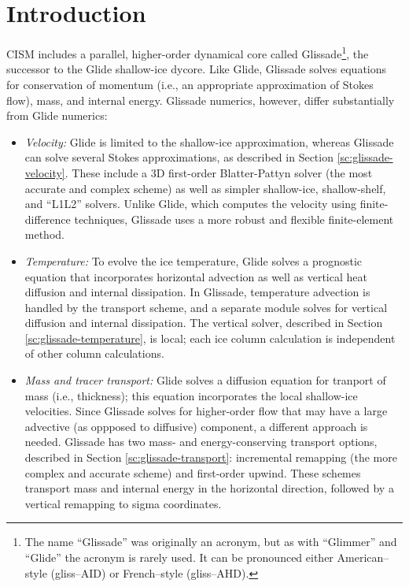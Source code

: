 

\section{Introduction}
\label{sc:glissade-intro}

CISM includes a parallel, higher-order dynamical core called Glissade\footnote
{The name ``Glissade'' was originally an acronym, but as with ``Glimmer'' and ``Glide'' the acronym is rarely used.
It can be pronounced either American--style (gliss--AID) or French--style (gliss--AHD).},
the successor to the Glide shallow-ice dycore.
Like Glide, Glissade solves equations for conservation of momentum
(i.e., an appropriate approximation of Stokes flow), mass, and internal energy. 
Glissade numerics, however, differ substantially from Glide numerics:

\begin{itemize}

\item \textit{Velocity:}
Glide is limited to the shallow-ice approximation, whereas Glissade can solve several Stokes
approximations, as described in Section \ref{sc:glissade-velocity}.
These include a 3D first-order Blatter-Pattyn solver (the most accurate and complex scheme)
as well as simpler shallow-ice, shallow-shelf, and ``L1L2'' solvers.
Unlike Glide, which computes the velocity using finite-difference techniques,
Glissade uses a more robust and flexible finite-element method.

\item \textit{Temperature:}
To evolve the ice temperature, Glide solves a prognostic equation that incorporates horizontal advection as well
as vertical heat diffusion and internal dissipation.  In Glissade, temperature advection is handled by the
transport scheme, and a separate module solves for vertical diffusion and internal dissipation.
The vertical solver, described in Section \ref{sc:glissade-temperature}, is local; 
each ice column calculation is independent of other column calculations.

\item \textit{Mass and tracer transport:}
Glide solves a diffusion equation for tranport of mass (i.e., thickness); this equation incorporates the local shallow-ice
velocities. Since Glissade solves for higher-order flow that may have a large advective (as oppposed to diffusive)
component, a different approach is needed.  Glissade has two mass- and energy-conserving transport options, 
described in Section \ref{sc:glissade-transport}:
incremental remapping (the more complex and accurate scheme) and first-order upwind. These schemes
transport mass and internal energy in the horizontal direction, followed by a vertical remapping to
sigma coordinates.

\end{itemize}

